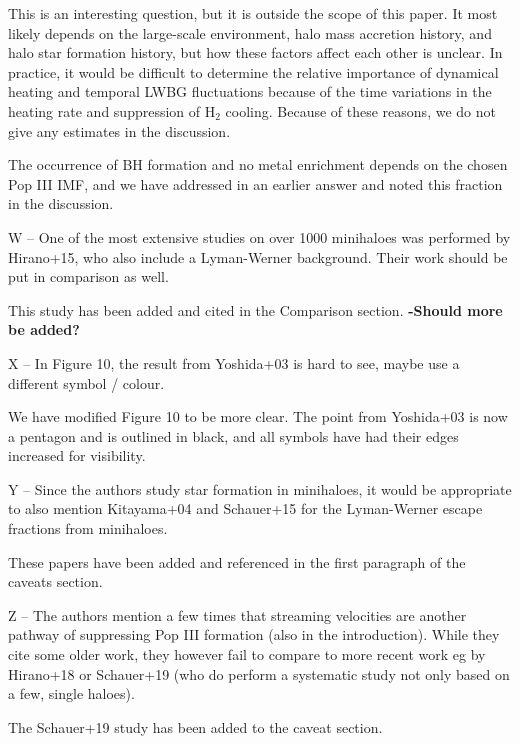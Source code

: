 \documentclass[11pt]{article}
\newenvironment{referee}[1][]{%
    \ignorespaces%
    \begin{mdframed}[style=myquotestyle,#1]%
}{%
    \end{mdframed}%
    \ignorespacesafterend%
}%
\begin{document}
This is an interesting question, but it is outside the scope of this paper.  It most likely depends on the large-scale environment, halo mass accretion history, and halo star formation history, but how these factors affect each other is unclear.  In practice, it would be difficult to determine the relative importance of dynamical heating and temporal LWBG fluctuations because of the time variations in the heating rate and suppression of H$_2$ cooling.  Because of these reasons, we do not give any estimates in the discussion.

The occurrence of BH formation and no metal enrichment depends on the chosen Pop III IMF, and we have addressed in an earlier answer and noted this fraction in the discussion.

\begin{referee}
W -- One of the most extensive studies on over 1000 minihaloes was performed by Hirano+15, who also include a Lyman-Werner background. Their work should be put in comparison as well.
\end{referee}
This study has been added and cited in the Comparison section.
\textbf{-Should more be added?}

\begin{referee}
X -- In Figure 10, the result from Yoshida+03 is hard to see, maybe use a different symbol / colour.
\end{referee}
We have modified Figure 10 to be more clear. The point from Yoshida+03 is now a pentagon and is outlined in black, and all symbols have had their edges increased for visibility.

\begin{referee}
Y -- Since the authors study star formation in minihaloes, it would be appropriate to also mention Kitayama+04 and Schauer+15 for the Lyman-Werner escape fractions from minihaloes.
\end{referee}
These papers have been added and referenced in the first paragraph of the caveats section. 

\begin{referee}
Z -- The authors mention a few times that streaming velocities are another pathway of suppressing Pop III formation (also in the introduction). While they cite some older work, they however fail to compare to more recent work eg by Hirano+18 or Schauer+19 (who do perform a systematic study not only based on a few, single haloes).
\end{referee}
The Schauer+19 study has been added to the caveat section.
\end{document}
